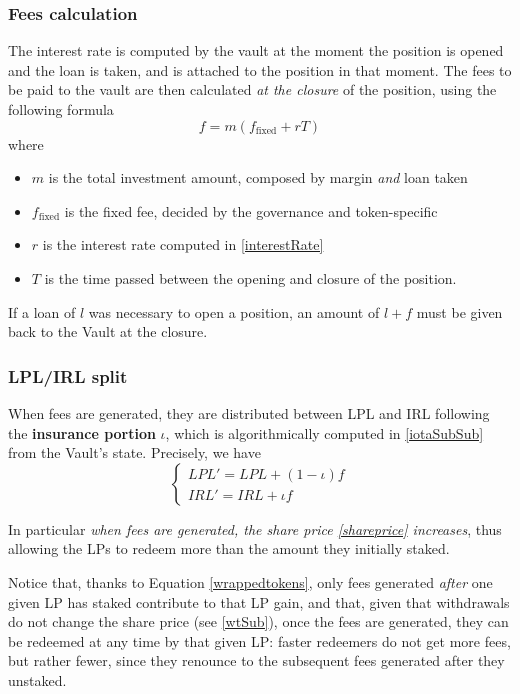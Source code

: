 \documentclass[a4paper,10 pt]{article}
\theoremstyle{definition}
\begin{document}
\subsubsection{Fees calculation}\label{dfSubSub}

The interest rate is computed by the vault at the moment the position is opened and the loan is taken, and is attached to the position in that moment. The fees to be paid to the vault are then calculated {\it at the closure} of the position, using the following formula 
\begin{equation}\label{duefees}
f = m(f_{\text{fixed}} + rT)
\end{equation}
where
\begin{itemize}
\item $m$ is the total investment amount, composed by margin {\it and} loan taken
\item $f_{\text{fixed}}$ is the fixed fee, decided by the governance and token-specific
\item  $r$ is the interest rate computed in \eqref{interestRate}
\item $T$ is the time passed between the opening and closure of the position.
\end{itemize}

If a loan of $l$ was necessary to open a position, an amount of $l + f$ must be given back to the Vault at the closure. 

\subsubsection{LPL/IRL split}\label{lisSubSub}

When fees are generated, they are distributed between LPL and IRL following the {\bf insurance portion} $\iota$, which is algorithmically computed in \ref{iotaSubSub} from the Vault's state. Precisely, we have
\begin{equation}\label{feesplit}
\begin{cases}
LPL' = LPL + (1-\iota)f \\
IRL' = IRL + \iota f
\end{cases}
\end{equation}

In particular {\it when fees are generated, the share price \eqref{shareprice} increases}, thus allowing the LPs to redeem more than the amount they initially staked.

Notice that, thanks to Equation \eqref{wrappedtokens}, only fees generated {\it after} one given LP has staked contribute to that LP gain, and that, given that withdrawals do not change the share price (see \ref{wtSub}), once the fees are generated, they can be redeemed at any time by that given LP: faster redeemers do not get more fees, but rather fewer, since they renounce to the subsequent fees generated after they unstaked.
\end{document}
